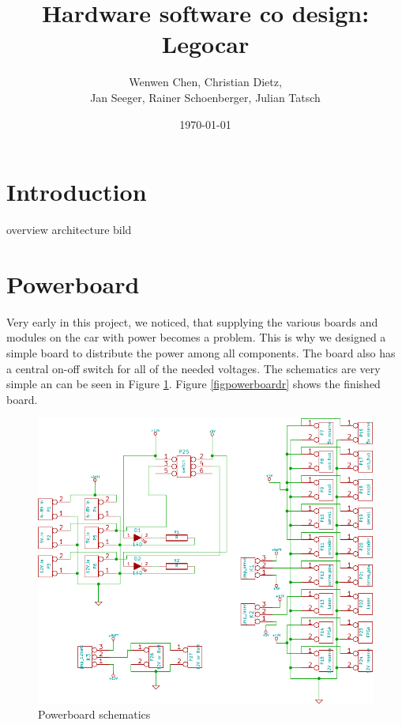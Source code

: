 \documentclass[a4paper
               ,10pt
               ,DIV=10 %
               ,BCOR=0.3cm
               ,pagesize %
               ,headings=small
               ,bibtotoc
               ]
               {scrartcl}
\title{Hardware software co design: Legocar}%
\author{Wenwen Chen, Christian Dietz, \\
	Jan Seeger, Rainer Schoenberger, Julian Tatsch
}
\date{\today}
\begin{document}
\maketitle

\begin{abstract}
\end{abstract}

\section{Introduction}

overview
architecture bild

\section{Powerboard}

Very early in this project, we noticed, that supplying the various boards and modules on the car with power becomes a problem.
This is why we designed a simple board to distribute the power among all components.
The board also has a central on-off switch for all of the needed voltages.
The schematics are very simple an can be seen in Figure \ref{figpowerboardscm}. Figure \ref{figpowerboardr} shows the finished board.

\begin{figure}[H]
\begin{center}
\includegraphics[width=0.7\linewidth]{pic/powerboard}
\caption{Powerboard schematics}
\label{figpowerboardscm}
\end{center}
\end{figure}
\end{document}
